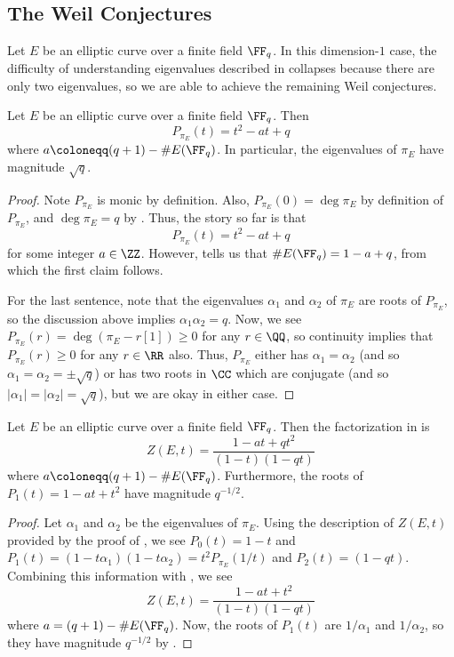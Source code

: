 \documentclass{amsart}
\begin{document}
\subsection{The Weil Conjectures}
Let $E$ be an elliptic curve over a finite field $\FF_q$. In this dimension-$1$ case, the difficulty of understanding eigenvalues described in  collapses because there are only two eigenvalues, so we are able to achieve the remaining Weil conjectures.
\begin{lemma} \label{lem:almost-rh}
	Let $E$ be an elliptic curve over a finite field $\FF_q$. Then
	\[P_{\pi_E}(t)=t^2-at+q\]
	where $a\coloneqq(q+1)-\#E(\FF_q)$. In particular, the eigenvalues of $\pi_E$ have magnitude $\sqrt q$.
\end{lemma}
\begin{proof}
	Note $P_{\pi_E}$ is monic by definition. Also, $P_{\pi_E}(0)=\deg\pi_E$ by definition of $P_{\pi_E}$, and $\deg\pi_E=q$ by . Thus, the story so far is that
	\[P_{\pi_E}(t)=t^2-at+q\]
	for some integer $a\in\ZZ$. However,  tells us that $\#E(\FF_q)=1-a+q$, from which the first claim follows.
	
	For the last sentence, note that the eigenvalues $\alpha_1$ and $\alpha_2$ of $\pi_E$ are roots of $P_{\pi_E}$, so the discussion above implies $\alpha_1\alpha_2=q$. Now, we see $P_{\pi_E}(r)=\deg(\pi_E-r[1])\ge0$ for any $r\in\QQ$, so continuity implies that $P_{\pi_E}(r)\ge0$ for any $r\in\RR$ also. Thus, $P_{\pi_E}$ either has $\alpha_1=\alpha_2$ (and so $\alpha_1=\alpha_2=\pm\sqrt q$) or has two roots in $\CC$ which are conjugate (and so $\left|\alpha_1\right|=\left|\alpha_2\right|=\sqrt q$), but we are okay in either case.
\end{proof}
\begin{theorem} \label{thm:rh}
	Let $E$ be an elliptic curve over a finite field $\FF_q$. Then the factorization in  is
	\[Z(E,t)=\frac{1-at+qt^2}{(1-t)(1-qt)}\]
	where $a\coloneqq (q+1)-\#E(\FF_q)$. Furthermore, the roots of $P_1(t)=1-at+t^2$ have magnitude $q^{-1/2}$.
\end{theorem}
\begin{proof}
	Let $\alpha_1$ and $\alpha_2$ be the eigenvalues of $\pi_E$. Using the description of $Z(E,t)$ provided by the proof of , we see $P_0(t)=1-t$ and $P_1(t)=(1-t\alpha_1)(1-t\alpha_2)=t^2P_{\pi_E}(1/t)$ and $P_2(t)=(1-qt)$. Combining this information with , we see
	\[Z(E,t)=\frac{1-at+t^2}{(1-t)(1-qt)}\]
	where $a=(q+1)-\#E(\FF_q)$. Now, the roots of $P_1(t)$ are $1/\alpha_1$ and $1/\alpha_2$, so they have magnitude $q^{-1/2}$ by .
\end{proof}
\end{document}
